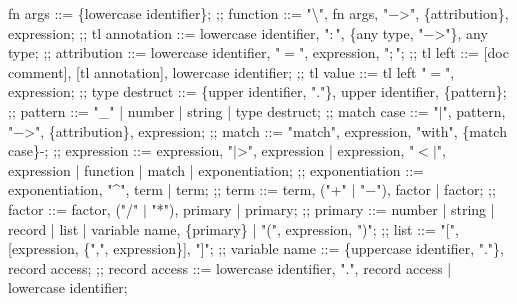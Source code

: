 \begin{bnfgrammar}
    fn args ::= \{lowercase identifier\};
    ;;
    function ::= "\textbackslash", fn args, "$-$>", \{attribution\}, expression;
    ;;
    tl annotation ::= lowercase identifier, "$\colon$", \{any type, "$-$>"\}, any type;
    ;;
    attribution ::= lowercase identifier, "$=$", expression, "$;$";
    ;;
    tl left ::= [doc comment], [tl annotation], lowercase identifier;
    ;;
    tl value ::= tl left "$=$", expression;
    ;;
    type destruct ::= \{upper identifier, "."\}, upper identifier, \{pattern\};
    ;;
    pattern ::= "\_"
    | number
    | string
    | type destruct;
    ;;
    match case ::= "$\vert$", pattern, "$-$>", \{attribution\}, expression;
    ;;
    match ::= "match", expression, "with", \{match case\}-;
    ;;
    expression ::= expression, "$\vert$>", expression
    | expression, "$<$$\vert$", expression
        | function
        | match
        | exponentiation;
        ;;
        exponentiation ::= exponentiation, "\textasciicircum", term
        | term;
        ;;
        term ::= term, ("+" $\vert$ "$-$"), factor
        | factor;
        ;;
        factor ::= factor, ("\slash" $\vert$ "*"), primary
    | primary;
    ;;
    primary ::= number
    | string
    | record
    | list
    | variable name, \{primary\}
    | "(", expression, ")";
    ;;
    list ::= "[", [expression, \{",", expression\}], "]";
    ;;
    variable name ::= \{uppercase identifier, "."\}, record access;
    ;;
    record access ::= lowercase identifier, ".", record access
    | lowercase identifier;
\end{bnfgrammar}
